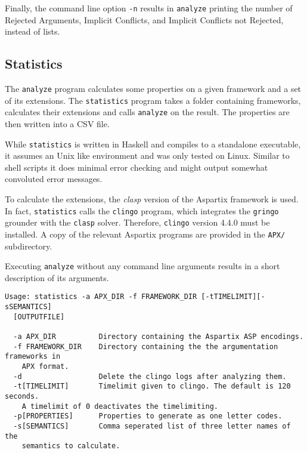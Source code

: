 \documentclass[parskip=half]{scrartcl}
\begin{document}
Finally, the command line option \texttt{-n} results in \texttt{analyze}
printing the number of Rejected Arguments, Implicit Conflicts, and Implicit
Conflicts not Rejected, instead of lists.

\subsection{Statistics}

The \texttt{analyze} program calculates some properties on a given framework and
a set of its extensions. The \texttt{statistics} program takes a folder
containing frameworks, calculates their extensions and calls \texttt{analyze} on
the result. The properties are then written into a CSV file.

While \texttt{statistics} is written in Haskell and compiles to a standalone
executable, it assumes an Unix like environment and was only tested on Linux.
Similar to shell scripts it does minimal error checking and might output
somewhat convoluted error messages.

To calculate the extensions, the \emph{clasp} version of the Aspartix framework
is used.  In fact, \texttt{statistics} calls the \texttt{clingo} program, which
integrates the \texttt{gringo} grounder with the \texttt{clasp} solver. Therefore,
\texttt{clingo} version 4.4.0 must be installed.  A copy of the relevant
Aspartix programs are provided in the \texttt{APX/} subdirectory.

Executing \texttt{analyze} without any command line arguments results in a short
description of its arguments.
\begin{verbatim}
Usage: statistics -a APX_DIR -f FRAMEWORK_DIR [-tTIMELIMIT][-sSEMANTICS]
  [OUTPUTFILE]

  -a APX_DIR          Directory containing the Aspartix ASP encodings.
  -f FRAMEWORK_DIR    Directory containing the the argumentation frameworks in
    APX format.
  -d                  Delete the clingo logs after analyzing them.
  -t[TIMELIMIT]       Timelimit given to clingo. The default is 120 seconds.
    A timelimit of 0 deactivates the timelimiting.
  -p[PROPERTIES]      Properties to generate as one letter codes.
  -s[SEMANTICS]       Comma seperated list of three letter names of the
    semantics to calculate.
\end{verbatim}
\end{document}

